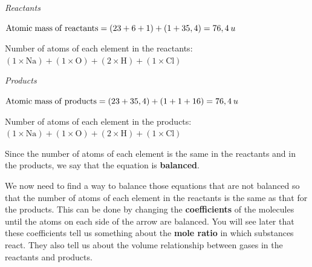     \addtocounter{footnote}{-0}
    
        \par 
        \label{m38726*id63546}
          \textsl{Reactants}
        \par 
        \label{m38726*id63553}\begin{math}\mathrm{Atomic\; mass\; of\; reactants}=\left(23+6+1\right)+\left(1+35,4\right)=\mathrm{76,4}\phantom{\rule{2pt}{0ex}}u\end{math}\par 
        \label{m38726*id63556}Number of atoms of each element in the reactants: \begin{math}\left(1\ensuremath{\times}\mathrm{Na}\right)+\left(1\ensuremath{\times}\mathrm{O}\right)+\left(2\ensuremath{\times}\mathrm{H}\right)+\left(1\ensuremath{\times}\mathrm{Cl}\right)\end{math} \par 
        \label{m38726*id63592}
          \textsl{Products}
        \par 
        \label{m38726*id63600}\begin{math}\mathrm{Atomic\; mass\; of\; products}=\left(23+35,4\right)+\left(1+1+16\right)=\mathrm{76,4}\phantom{\rule{2pt}{0ex}}u\end{math}\par 
        \label{m38726*id63604}Number of atoms of each element in the products: \begin{math}\left(1\ensuremath{\times}\mathrm{Na}\right)+\left(1\ensuremath{\times}\mathrm{O}\right)+\left(2\ensuremath{\times}\mathrm{H}\right)+\left(1\ensuremath{\times}\mathrm{Cl}\right)\end{math}\par 
        \label{m38726*id63639}Since the number of atoms of each element is the same in the reactants and in the products, we say that the equation is \textbf{balanced}.\par 
        \label{m38726*id63649}We now need to find a way to balance those equations that are not balanced so that the number of atoms of each element in the reactants is the same as that for the products. This can be done by changing the \textbf{coefficients} of the molecules until the atoms on each side of the arrow are balanced. You will see later that these coefficients tell us something about the \textbf{mole ratio} in which substances react. They also tell us about the volume relationship between gases in the reactants and products.\par 
\label{m38726*notfhsst!!!underscore!!!id276}
